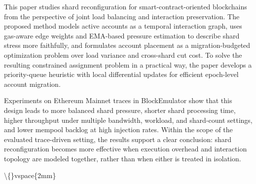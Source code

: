 \documentclass{article}
\begin{document}
This paper studies shard reconfiguration for smart-contract-oriented blockchains from the perspective of joint load balancing and interaction preservation. The proposed method models active accounts as a temporal interaction graph, uses gas-aware edge weights and EMA-based pressure estimation to describe shard stress more faithfully, and formulates account placement as a migration-budgeted optimization problem over load variance and cross-shard cut cost. To solve the resulting constrained assignment problem in a practical way, the paper develops a priority-queue heuristic with local differential updates for efficient epoch-level account migration.

Experiments on Ethereum Mainnet traces in BlockEmulator show that this design leads to more balanced shard pressure, shorter shard processing time, higher throughput under multiple bandwidth, workload, and shard-count settings, and lower mempool backlog at high injection rates. Within the scope of the evaluated trace-driven setting, the results support a clear conclusion: shard reconfiguration becomes more effective when execution overhead and interaction topology are modeled together, rather than when either is treated in isolation.

\textbackslash\{\}vspace\{2mm\}



\end{document}
